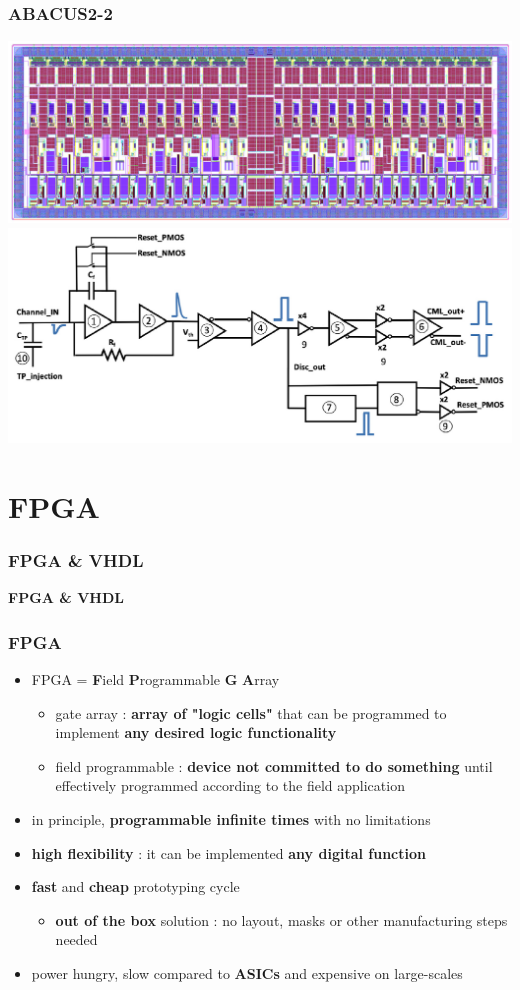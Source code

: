 \documentclass[aspectratio=169]{beamer}
\begin{document}
	
	\begin{frame}
	\frametitle{ABACUS2-2}
	\begin{center}
		\includegraphics[width=0.6 \textwidth]{IMG/ABACUS.PNG}
		\includegraphics[width=0.6 \textwidth]{IMG/ABACUS_channel.PNG}
	\end{center}
	\end{frame}

	\section{FPGA}
	
		
	\begin{frame}
	\frametitle{FPGA \& VHDL}
	\begin{center}
		{\Huge {}\selectfont \color{blue} \textbf{FPGA \& VHDL}}
	\end{center}
	\end{frame}
	
	\begin{frame}
	\frametitle{FPGA}
	{\Large 
		\begin{itemize}
			\item FPGA = \textbf{F}ield \textbf{P}rogrammable \textbf{G} \textbf{A}rray
			\begin{itemize}
				\item gate array : \textbf{array of "logic cells"} that can be programmed to implement \textbf{any desired logic functionality}
				\item field programmable : \textbf{device not committed to do something} until effectively programmed according to the field application
			\end{itemize}
		\item in principle, \textbf{programmable infinite times} with no limitations
		\item \textbf{high flexibility} : it can be implemented \textbf{any digital function}
		\item \textbf{fast} and \textbf{cheap} prototyping cycle
		\begin{itemize}
			\item \textbf{out of the box} solution : no layout, masks or other manufacturing steps needed
		\end{itemize}
		\item {\color{orange} power hungry, slow compared to \textbf{ASICs} and expensive on large-scales}
		\end{itemize}
	}
	\end{frame}
\end{document}
